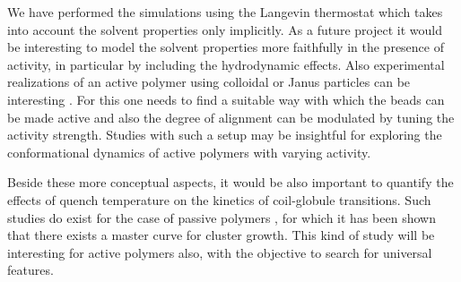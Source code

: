 \documentclass[aps,prx,reprint,showpacs,showkeys,noeprint,longbibliography]{revtex4-1} %
\begin{document}
\par
We have performed the simulations using the Langevin thermostat which takes into account the solvent properties only implicitly. As a future project it would be interesting to model the solvent properties more faithfully in the presence of activity, in particular by including the hydrodynamic effects.  Also experimental realizations of an active polymer using colloidal or Janus particles can be interesting \cite{ramirez,daiki}. For this  one needs to find a suitable way with which the beads can be made active and also the degree of alignment can be modulated by tuning the activity strength. Studies with such a setup may be insightful for exploring the conformational dynamics of active polymers with varying activity.
\par
Beside these more conceptual aspects, it would be also important to quantify the effects of quench temperature
on the kinetics of coil-globule transitions. Such studies do exist for the case of passive polymers \cite{majumder3}, 
for which it has been shown that there exists a master curve for cluster growth. This kind of study will 
be interesting for active polymers also, with the objective to search for 
universal features.\\
\end{document}
